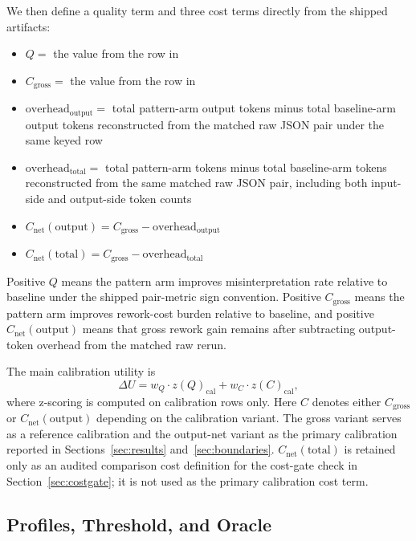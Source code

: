 \documentclass[11pt,a4paper]{article}
\begin{document}
We then define a quality term and three cost terms directly from the shipped
artifacts:
\begin{itemize}
  \item $Q =$ the  value from the
   row in 
  \item $C_{\mathrm{gross}} =$ the  value from the
   row in 
  \item $\mathrm{overhead}_{\mathrm{output}} =$ total pattern-arm output tokens
  minus total baseline-arm output tokens reconstructed from the matched raw JSON
  pair under the same keyed row
  \item $\mathrm{overhead}_{\mathrm{total}} =$ total pattern-arm tokens minus
  total baseline-arm tokens reconstructed from the same matched raw JSON pair,
  including both input-side and output-side token counts
  \item $C_{\mathrm{net}}(\mathrm{output}) = C_{\mathrm{gross}} - \mathrm{overhead}_{\mathrm{output}}$
  \item $C_{\mathrm{net}}(\mathrm{total}) = C_{\mathrm{gross}} - \mathrm{overhead}_{\mathrm{total}}$
\end{itemize}

Positive $Q$ means the pattern arm improves misinterpretation rate relative to
baseline under the shipped pair-metric sign convention. Positive
$C_{\mathrm{gross}}$ means the pattern arm improves rework-cost burden relative to
baseline, and positive \(C_{\mathrm{net}}(\mathrm{output})\) means that gross
rework gain remains after subtracting output-token overhead from the matched raw
rerun.

The main calibration utility is
\[
\Delta U = w_Q \cdot z(Q)_{\mathrm{cal}} + w_C \cdot z(C)_{\mathrm{cal}},
\]
where z-scoring is computed on calibration rows only.
Here $C$ denotes either $C_{\mathrm{gross}}$ or $C_{\mathrm{net}}(\mathrm{output})$ depending on the calibration variant.
The gross variant serves as a reference calibration and the output-net variant as
the primary calibration reported in Sections~\ref{sec:results}
and~\ref{sec:boundaries}. $C_{\mathrm{net}}(\mathrm{total})$ is retained only as
an audited comparison cost definition for the cost-gate check in
Section~\ref{sec:costgate}; it is not used as the primary calibration cost term.

\subsection{Profiles, Threshold, and Oracle}
\label{sec:profiles}
\end{document}
